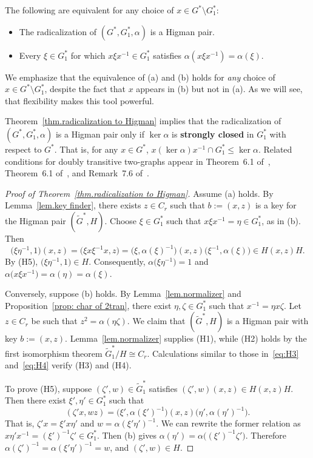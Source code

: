 \begin{theorem}
\label{thm.radicalization to Higman}
The following are equivalent for any choice of $x\in G^* \setminus G^*_1$:
\begin{itemize}
\item[(a)]
The radicalization of $(G^*,G^*_1,\alpha)$ is a Higman pair.
\item[(b)]
Every $\xi \in G^*_1$ for which $x\xi x^{-1} \in G^*_1$ satisfies $\alpha(x\xi x^{-1}) = \alpha(\xi)$.
\end{itemize}
\end{theorem}

We emphasize that the equivalence of (a) and (b) holds for \emph{any} choice of $x \in G^* \setminus G_1^*$, despite the fact that $x$ appears in (b) but not in (a).
As we will see, that flexibility makes this tool powerful.

Theorem~\ref{thm.radicalization to Higman} implies that the radicalization of $(G^*,G^*_1,\alpha)$ is a Higman pair only if $\ker \alpha $ is \textbf{strongly closed} in $G_1^*$ with respect to $G^*$.
That is, for any $x \in G^*$, $x(\ker \alpha)x^{-1} \cap G_1^* \leq \ker \alpha$.
Related conditions for doubly transitive two-graphs appear in Theorem~6.1 of~\cite{Taylor:77}, Theorem~6.1 of~\cite{Cameron:77}, and Remark~7.6 of~\cite{Seidel:76}.


\begin{proof}[Proof of Theorem~\ref{thm.radicalization to Higman}]
Assume (a) holds.
By Lemma~\ref{lem.key finder}, there exists $z \in C_r$ such that $b:=(x,z)$ is a key for the Higman pair $(\widetilde{G}^*,H)$.
Choose $\xi \in G_1^*$ such that $x \xi x^{-1} = \eta \in G^*_1$, as in (b).
Then
\[
\bigl(\xi \eta^{-1}, 1\bigr)(x,z)
= \bigl(\xi x \xi^{-1} x, z\bigr)
= \bigl(\xi, \alpha(\xi)^{-1} \bigr) (x,z) \bigl( \xi^{-1}, \alpha(\xi) \bigr)
\in H(x,z)H.
\]
By (H5), $\bigl(\xi \eta^{-1}, 1\bigr) \in H$. Consequently, $\alpha\bigl(\xi \eta^{-1}\bigr) = 1$ and $\alpha\bigl(x\xi x^{-1}\bigr) = \alpha(\eta) = \alpha(\xi)$.

Conversely, suppose (b) holds.
By Lemma~\ref{lem.normalizer} and Proposition~\ref{prop: char of 2tran}, there exist $\eta, \zeta \in G_1^*$ such that $x^{-1} = \eta x \zeta$.
Let $z \in C_r$ be such that $z^2 = \alpha(\eta \zeta)$.
We claim that $(\widetilde{G}^*,H)$ is a Higman pair with key $b := (x,z)$.
Lemma~\ref{lem.normalizer} supplies (H1), while (H2) holds by the first isomorphism theorem $\widetilde{G}^*_1 / H \cong C_r$.
Calculations similar to those in~\eqref{eq:H3} and~\eqref{eq:H4} verify (H3) and (H4).

To prove (H5), suppose $(\zeta',w) \in \widetilde{G}^*_1$ satisfies $(\zeta',w)(x,z) \in H(x,z)H$.
Then there exist $\xi',\eta' \in G_1^*$ such that
\[ (\zeta' x, wz) = \bigl(\xi', \alpha(\xi')^{-1}\bigr) (x,z) \bigl( \eta', \alpha(\eta')^{-1} \bigr). \]
That is, $\zeta' x = \xi' x \eta'$ and $w = \alpha( \xi' \eta')^{-1}$.
We can rewrite the former relation as $x \eta' x^{-1} = (\xi')^{-1} \zeta' \in G_1^*$.
Then (b) gives $\alpha(\eta') = \alpha\bigl( (\xi')^{-1} \zeta')$.
Therefore $\alpha(\zeta')^{-1} = \alpha(\xi' \eta')^{-1} = w$, and $(\zeta', w) \in H$.
\end{proof}

